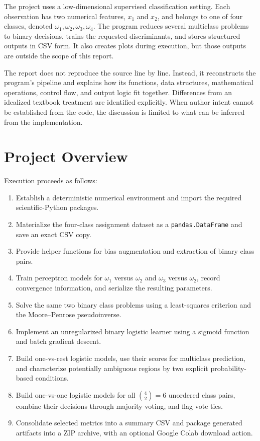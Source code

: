 \documentclass[11pt,a4paper]{article}
\newcommand{\code}[1]{\texttt{#1}}
\begin{document}
The project uses a low-dimensional supervised classification setting. Each observation has two numerical features, \(x_1\) and \(x_2\), and belongs to one of four classes, denoted \(\omega_1,\omega_2,\omega_3,\omega_4\). The program reduces several multiclass problems to binary decisions, trains the requested discriminants, and stores structured outputs in CSV form. It also creates plots during execution, but those outputs are outside the scope of this report.

The report does not reproduce the source line by line. Instead, it reconstructs the program's pipeline and explains how its functions, data structures, mathematical operations, control flow, and output logic fit together. Differences from an idealized textbook treatment are identified explicitly. When author intent cannot be established from the code, the discussion is limited to what can be inferred from the implementation.

\section{Project Overview}
Execution proceeds as follows:

\begin{enumerate}
    \item Establish a deterministic numerical environment and import the required scientific-Python packages.
    \item Materialize the four-class assignment dataset as a \code{pandas.DataFrame} and save an exact CSV copy.
    \item Provide helper functions for bias augmentation and extraction of binary class pairs.
    \item Train perceptron models for \(\omega_1\) versus \(\omega_2\) and \(\omega_3\) versus \(\omega_2\), record convergence information, and serialize the resulting parameters.
    \item Solve the same two binary class problems using a least-squares criterion and the Moore--Penrose pseudoinverse.
    \item Implement an unregularized binary logistic learner using a sigmoid function and batch gradient descent.
    \item Build one-vs-rest logistic models, use their scores for multiclass prediction, and characterize potentially ambiguous regions by two explicit probability-based conditions.
    \item Build one-vs-one logistic models for all \(\binom{4}{2}=6\) unordered class pairs, combine their decisions through majority voting, and flag vote ties.
    \item Consolidate selected metrics into a summary CSV and package generated artifacts into a ZIP archive, with an optional Google Colab download action.
\end{enumerate}
\end{document}
